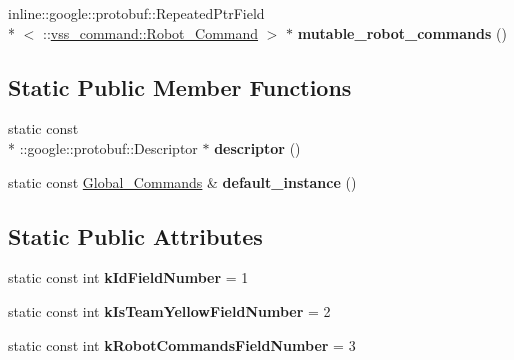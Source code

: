 \begin{DoxyCompactItemize}
\item 
\hypertarget{classvss__command_1_1Global__Commands_a3de88f16ed28f63fed38eff2ef169df4}{inline\-::google\-::protobuf\-::\-Repeated\-Ptr\-Field\\*
$<$ \-::\hyperlink{classvss__command_1_1Robot__Command}{vss\-\_\-command\-::\-Robot\-\_\-\-Command} $>$ $\ast$ {\bfseries mutable\-\_\-robot\-\_\-commands} ()}\label{classvss__command_1_1Global__Commands_a3de88f16ed28f63fed38eff2ef169df4}

\end{DoxyCompactItemize}
\subsection*{Static Public Member Functions}
\begin{DoxyCompactItemize}
\item 
\hypertarget{classvss__command_1_1Global__Commands_a26e4245a80fa599d0e30613122af7ad9}{static const \\*
\-::google\-::protobuf\-::\-Descriptor $\ast$ {\bfseries descriptor} ()}\label{classvss__command_1_1Global__Commands_a26e4245a80fa599d0e30613122af7ad9}

\item 
\hypertarget{classvss__command_1_1Global__Commands_a9e44db388aae4a529e0bff71979eea66}{static const \hyperlink{classvss__command_1_1Global__Commands}{Global\-\_\-\-Commands} \& {\bfseries default\-\_\-instance} ()}\label{classvss__command_1_1Global__Commands_a9e44db388aae4a529e0bff71979eea66}

\end{DoxyCompactItemize}
\subsection*{Static Public Attributes}
\begin{DoxyCompactItemize}
\item 
\hypertarget{classvss__command_1_1Global__Commands_a67c9ce208f0648844211d1faca128e34}{static const int {\bfseries k\-Id\-Field\-Number} = 1}\label{classvss__command_1_1Global__Commands_a67c9ce208f0648844211d1faca128e34}

\item 
\hypertarget{classvss__command_1_1Global__Commands_a90443d587b7a5171b061ec96660b04ef}{static const int {\bfseries k\-Is\-Team\-Yellow\-Field\-Number} = 2}\label{classvss__command_1_1Global__Commands_a90443d587b7a5171b061ec96660b04ef}

\item 
\hypertarget{classvss__command_1_1Global__Commands_a65b203ec091ad5cce5fcb7b34b01bcf1}{static const int {\bfseries k\-Robot\-Commands\-Field\-Number} = 3}\label{classvss__command_1_1Global__Commands_a65b203ec091ad5cce5fcb7b34b01bcf1}

\end{DoxyCompactItemize}
